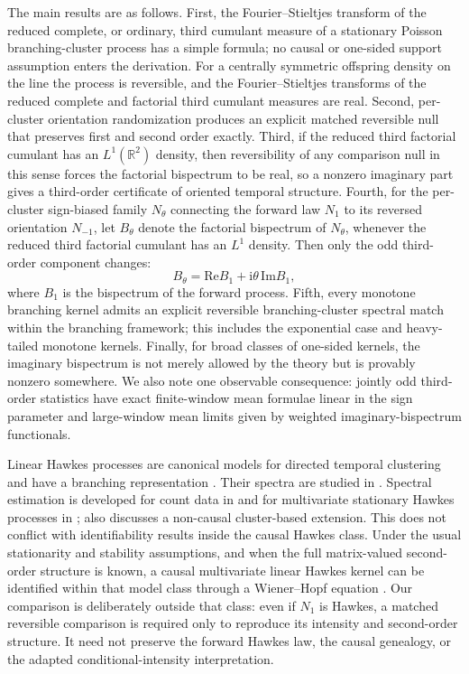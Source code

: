 \documentclass[aap,press]{apt} \volno{00} \partno{00}
\newcommand{\R}{\mathbb{R}}
\renewcommand{\ii}{\mathrm{i}}
\newcommand{\1}{\mathbf{1}}
\newcommand{\Ree}{\mathrm{Re}}
\newcommand{\Imm}{\mathrm{Im}}
\numberwithin{equation}{section}
\begin{document}
The main results are as follows. First, the Fourier--Stieltjes transform of the reduced complete, or ordinary, third cumulant measure of a stationary Poisson branching-cluster process has a simple formula; no causal or one-sided support assumption enters the derivation. For a centrally symmetric offspring density on the line the process is reversible, and the  Fourier--Stieltjes  transforms of the reduced complete and factorial third cumulant measures are real. Second, per-cluster orientation randomization produces an explicit matched reversible null that preserves first and second order exactly. Third, if the reduced third factorial cumulant has an $L^1(\R^2)$ density, then reversibility of any comparison null in this sense forces the factorial bispectrum to be real, so a nonzero imaginary part gives a third-order certificate of oriented temporal structure. Fourth, for the per-cluster sign-biased family \(N_\theta\)
connecting the forward law \(N_1\) to its reversed orientation
\(N_{-1}\), let \(B_\theta\) denote the factorial bispectrum of
\(N_\theta\), whenever the reduced third factorial cumulant has an
\(L^1\) density. Then only the odd third-order component changes:
\[
B_\theta=\Ree B_1+\ii\theta\,\Imm B_1,
\]
where \(B_1\) is the bispectrum of the forward process.
Fifth, every monotone branching kernel admits an explicit reversible branching-cluster spectral match within the branching framework; this includes the exponential case and heavy-tailed monotone kernels. Finally, for broad classes of one-sided kernels, the imaginary bispectrum is not merely allowed by the theory but is provably nonzero somewhere. We also note one observable consequence: jointly odd third-order statistics have exact finite-window mean formulae linear in the sign parameter and large-window mean limits given by weighted imaginary-bispectrum functionals.

Linear Hawkes processes are canonical models for directed temporal
clustering and have a branching representation \cite{HawkesOakes1974}.
Their spectra are studied in \cite{Hawkes1971}. Spectral estimation is developed for count data in \cite{cheysson2022spectral} and for multivariate stationary Hawkes processes in \cite{tang2026spectral}; \cite{cheysson2022spectral} also discusses a non-causal cluster-based extension. This does not conflict with identifiability results inside the causal Hawkes class. Under the usual
stationarity and stability assumptions, and when the full matrix-valued
second-order structure is known, a causal multivariate linear Hawkes
kernel can be identified within that model class through a Wiener--Hopf
equation \cite{BacryMuzy2016}. Our comparison is deliberately outside
that class: even if \(N_1\) is Hawkes, a matched reversible comparison
is required only to reproduce its intensity and second-order structure.
It need not preserve the forward Hawkes law, the causal genealogy, or
the adapted conditional-intensity interpretation.
\end{document}

